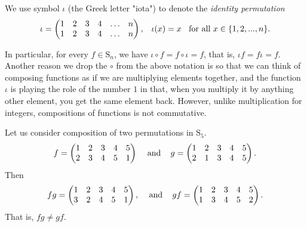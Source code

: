 \documentclass[11pt,dvipsnames]{book}
\numberwithin{equation}{section} %
\numberwithin{figure}{section} %
\numberwithin{table}{section} %
\begin{document}
We use symbol $\iota$ (the Greek letter "iota") to denote the  {\it identity permutation}
$$
\iota =  \left(\begin{matrix} %
1 & 2 & 3 & 4 & \ldots & n \cr%
1 & 2 & 3 & 4 & \ldots & n\cr%
\end{matrix}\right), \;\;\; \iota(x) =x \;\;\mbox{ for all } x\in \{1,2,...,n\}.
$$

In particular, for every $f\in\mathrm{S}_{n}$,  we have $\iota\circ f=f\circ\iota=f$, that is, $\iota f=f\iota=f$.\\

%



%

Another reason we drop the $\circ$ from the above notation is so that we can think of composing functions as if we are multiplying elements together, and the function $\iota$ is playing the role of the number $1$ in that, when you multiply it by anything other element, you get the same element back.  However, unlike multiplication for integers, compositions of functions is not commutative. 



 \begin{example}
  Let us consider composition of two permutations in $\mathrm{S}_5$.
  \[
  f= \left(\begin{matrix} %
1 & 2 & 3 & 4 & 5 \cr%
2 & 3 & 4 & 5 & 1\cr%
\end{matrix}\right)\;\;\;\mbox{ and } \;\;\; g=\left(\begin{matrix} %
1 & 2 & 3 & 4 & 5 \cr%
2 & 1 & 3 & 4 & 5\cr%
\end{matrix}\right).
\]
Then
\[
fg= \left(\begin{matrix} %
1 & 2 & 3 & 4 & 5 \cr%
3 & 2 & 4 & 5 & 1\cr%
\end{matrix}\right), \;\;\; \mbox{ and }\;\;\; gf = \left(\begin{matrix} %
1 & 2 & 3 & 4 & 5 \cr%
1 & 3 & 4 & 5 & 2\cr%
\end{matrix}\right).
\]
That is, $fg\neq gf$.
\end{example}
\end{document}
